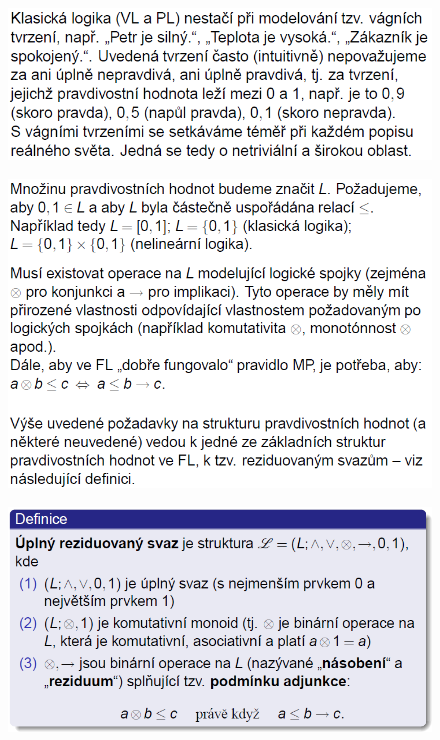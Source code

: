 \documentclass[10pt,a4paper]{article}
\theoremstyle{note}
\begin{document}
			\begin{figure}[H]
			\centering
			\includegraphics[width=13cm]{img/fuzzy1.png}
			\end{figure}

			\begin{figure}[H]
			\centering
			\includegraphics[width=13cm]{img/fuzzy2.png}
			\end{figure}

			\begin{figure}[H]
			\centering
			\includegraphics[width=13cm]{img/fuzzy3.png}
			\end{figure}
\end{document}
